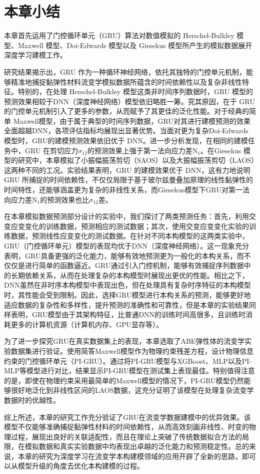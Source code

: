 \section{本章小结}

本章首先运用了门控循环单元（GRU）算法对数值模拟的 Herschel-Bulkley 模型、Maxwell 模型、Doi-Edwards 模型以及 Giesekus 模型所产生的模拟数据展开深度学习建模工作。

研究结果揭示出，GRU 作为一种循环神经网络，依托其独特的门控单元机制，能够精准地捕捉黏弹性材料流变学模拟数据所蕴含的时间依赖性以及复杂非线性特征。特别的，在处理 Herschel-Bulkley 模型这类非时间序列数据时，GRU 模型的预测效果相较于DNN（深度神经网络）模型依旧略胜一筹。究其原因，在于 GRU 的门控单元机制引入了更多的参数，从而赋予了其更佳的泛化性能。对于经典的简单 Maxwell模型，由于属于典型的时间序列数据，GRU对其进行建模预测的效果全面超越DNN，各项评估指标均展现出显著优势。当面对更为复杂Doi-Edwards 模型时，GRU的建模预测效果依旧优于 DNN。进一步分析发现，在相同的建模任务中，GRU 在剪切应力$\sigma_{12}$的预测效果上强于第一法向应力差N$_1$。在Giesekus 模型的研究中，本章模拟了小振幅振荡剪切（SAOS）以及大振幅振荡剪切（LAOS）这两种不同的工况。实验结果表明，GRU 的建模效果优于 DNN，这有力地说明 GRU 所捕捉的时间依赖性，不仅仅局限于基于玻尔兹曼叠加原理的线性黏弹性的时间特性，还能够涵盖更为复杂的非线性关系，而Giesekus模型下GRU对第一法向应力差N$_1$的预测效果也比$\sigma_{12}$差。

在本章模拟数据预测部分设计的实验中，我们探讨了两类预测任务：首先，利用交变应变变化的训练数据，预测相应的测试数据；其次，使用交变应变变化实验的训练数据，预测线性应变变化的测试数据。在针对不同本构模型的这两类实验中，GRU（门控循环单元）模型的表现均优于DNN（深度神经网络）。这一现象充分表明，GRU具备更强的泛化能力，能够有效地预测更为一般化的本构关系，而不仅仅是进行简单的函数逼近。GRU通过引入门控机制，能够有效捕捉序列数据中的长期依赖关系，从而在处理复杂的本构模型时展现出更优的性能。相比之下，DNN虽然在非时序本构模型中表现出色，但在处理具有复杂时序特征的本构模型时，其性能会受到限制。因此，选择GRU模型进行本构关系的预测，能够更好地适应数据的复杂性和多样性，提升预测的准确性和可靠性，但是本章的实验结果同样表明，GRU模型由于其架构特征，比普通DNN的训练时间高很多，且训练时消耗更多的计算机资源（计算机内存、GPU显存等）。

为了进一步探究GRU在真实数据集上的表现，本章选取了ABE弹性体的流变学实验数据集进行验证。使用简答Maxwell模型作为物理约束残差方程，设计物理信息约束的门控循环单元（PI-GRU）。通过将PI-GRU模型与XGBoost、MLP以及PI-MLP等模型进行对比，结果显示PI-GRU模型在测试集上表现最佳。特别值得注意的是，即使在物理约束采用最简单的Maxwell模型的情况下，PI-GRU模型仍然能够很好地泛化到非线性区间的LAOS数据，这充分证明了该模型在处理复杂流变学数据时的优越性。

综上所述，本章的研究工作充分验证了GRU在流变学数据建模中的优异效果。该模型不仅能够准确捕捉黏弹性材料的时间依赖性，从而高效刻画非线性、时变的物理过程，展现出良好的关联适配性，而且在理论上突破了传统数据拟合方法的局限，在模拟数据和真实实验数据中均表现出卓越的泛化能力和预测稳定性。总的来说，本章的研究为深度学习在流变学本构建模领域的应用开辟了全新的思路，即可以从模型升级的角度去优化本构建模的过程。





